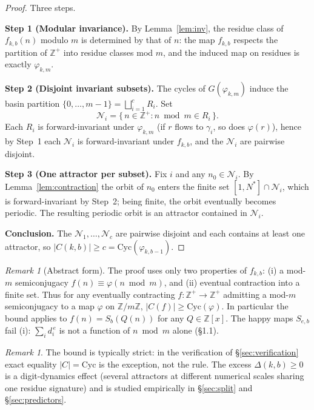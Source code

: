 \documentclass[11pt]{article}
\theoremstyle{definition}
\theoremstyle{remark}
\newtheorem{remark}[theorem]{Remark}
\newcommand{\Cyc}{\mathrm{Cyc}}
\begin{document}
\begin{proof}
Three steps.

\textbf{Step 1 (Modular invariance).} By Lemma~\ref{lem:inv}, the residue class of $f_{k,b}(n)$ modulo $m$ is determined by that of $n$: the map $f_{k,b}$ respects the partition of $\mathbb{Z}^+$ into residue classes mod $m$, and the induced map on residues is exactly $\varphi_{k,m}$.

\textbf{Step 2 (Disjoint invariant subsets).} The cycles of $G(\varphi_{k,m})$ induce the basin partition $\{0,\dots,m-1\} = \bigsqcup_{i=1}^{c} R_i$. Set
\[
\mathcal{N}_i = \{\, n \in \mathbb{Z}^+ : n \bmod m \in R_i \,\}.
\]
Each $R_i$ is forward-invariant under $\varphi_{k,m}$ (if $r$ flows to $\gamma_i$, so does $\varphi(r)$), hence by Step~1 each $\mathcal{N}_i$ is forward-invariant under $f_{k,b}$, and the $\mathcal{N}_i$ are pairwise disjoint.

\textbf{Step 3 (One attractor per subset).} Fix $i$ and any $n_0 \in \mathcal{N}_i$. By Lemma~\ref{lem:contraction} the orbit of $n_0$ enters the finite set $[1,N^*] \cap \mathcal{N}_i$, which is forward-invariant by Step~2; being finite, the orbit eventually becomes periodic. The resulting periodic orbit is an attractor contained in $\mathcal{N}_i$.

\textbf{Conclusion.} The $\mathcal{N}_1,\dots,\mathcal{N}_c$ are pairwise disjoint and each contains at least one attractor, so $|C(k,b)| \ge c = \Cyc(\varphi_{k,b-1})$.
\end{proof}

\begin{remark}[Abstract form]\label{rem:abstract}
The proof uses only two properties of $f_{k,b}$: (i) a mod-$m$ semiconjugacy $f(n)\equiv\varphi(n\bmod m)$, and (ii) eventual contraction into a finite set. Thus for any eventually contracting $f:\mathbb{Z}^+\to\mathbb{Z}^+$ admitting a mod-$m$ semiconjugacy to a map $\varphi$ on $\mathbb{Z}/m\mathbb{Z}$, $|C(f)|\ge\Cyc(\varphi)$. In particular the bound applies to $f(n)=S_b(Q(n))$ for any $Q\in\mathbb{Z}[x]$. The happy maps $S_{e,b}$ fail (i): $\sum_i d_i^{\,e}$ is not a function of $n\bmod m$ alone (\S1.1).
\end{remark}

\begin{remark}
The bound is typically strict: in the verification of \S\ref{sec:verification} exact equality $|C| = \Cyc$ is the exception, not the rule. The excess $\Delta(k,b) \ge 0$ is a digit-dynamics effect (several attractors at different numerical scales sharing one residue signature) and is studied empirically in \S\ref{sec:split} and \S\ref{sec:predictors}.
\end{remark}
\end{document}
